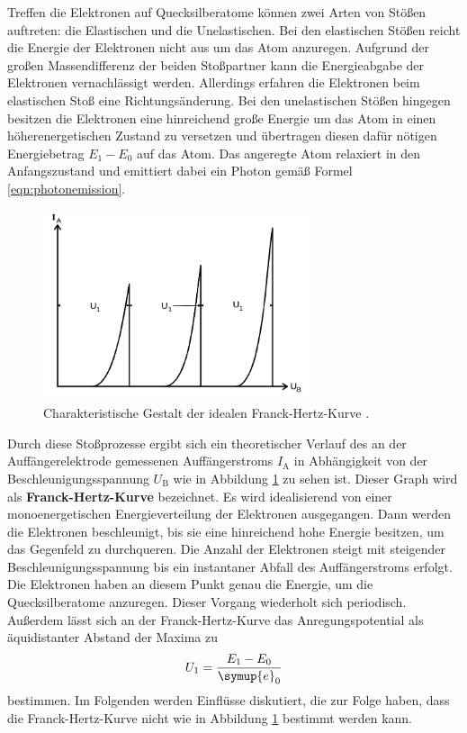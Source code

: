 Treffen die Elektronen auf Quecksilberatome können zwei Arten von Stößen auftreten: die
Elastischen und die Unelastischen. Bei den elastischen Stößen reicht die Energie der Elektronen
nicht aus um das Atom anzuregen. Aufgrund der großen Massendifferenz der beiden Stoßpartner
kann die Energieabgabe der Elektronen vernachlässigt werden. Allerdings erfahren die Elektronen
beim elastischen Stoß eine Richtungsänderung.
Bei den unelastischen Stößen hingegen besitzen die Elektronen eine hinreichend große
Energie um das Atom in einen höherenergetischen Zustand zu versetzen und übertragen diesen
dafür nötigen Energiebetrag $E_1-E_0$ auf das Atom.
Das angeregte Atom relaxiert in den Anfangszustand und emittiert dabei ein Photon gemäß
Formel \eqref{eqn:photonemission}.
\begin{figure}
  \centering
  \includegraphics[width=0.7\textwidth]{Bilder/ideale_hertzkurve.png}
  \caption{Charakteristische Gestalt der idealen Franck-Hertz-Kurve \cite{Anleitung}.}
  \label{fig:franckhertzkurve}
\end{figure}
Durch diese Stoßprozesse ergibt sich ein theoretischer Verlauf des an der Auffängerelektrode
gemessenen Auffängerstroms $I_{\mathrm{A}}$ in Abhängigkeit von der Beschleunigungsspannung
$U_{\mathrm{B}}$ wie in Abbildung \ref{fig:franckhertzkurve} zu sehen ist.
Dieser Graph wird als \textbf{Franck-Hertz-Kurve} bezeichnet.
Es wird idealisierend von einer monoenergetischen Energieverteilung der Elektronen ausgegangen.
Dann werden die Elektronen beschleunigt, bis sie eine hinreichend hohe Energie besitzen, um
das Gegenfeld zu durchqueren. Die Anzahl der Elektronen steigt mit steigender
Beschleunigungsspannung bis ein instantaner Abfall des Auffängerstroms erfolgt. Die Elektronen
haben an diesem Punkt genau die Energie, um die Quecksilberatome anzuregen. Dieser Vorgang
wiederholt sich periodisch.
Außerdem lässt sich an der Franck-Hertz-Kurve das Anregungspotential als äquidistanter
Abstand der Maxima zu
\begin{equation}
	U_1 = \frac{E_1-E_0}{\symup{e}_0}
\end{equation}
bestimmen.
Im Folgenden werden Einflüsse diskutiert, die zur Folge haben, dass die Franck-Hertz-Kurve nicht
wie in Abbildung \ref{fig:franckhertzkurve} bestimmt werden kann.
